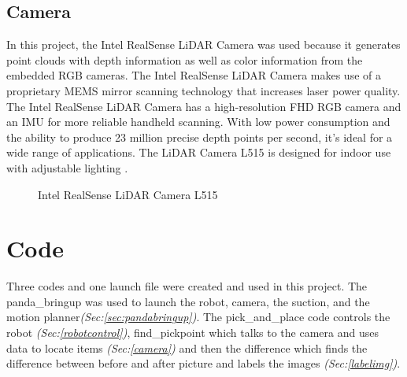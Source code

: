 \subsection{Camera\label{subsec:camera}} 
In this project, the Intel RealSense LiDAR Camera was used because it generates point clouds with depth information as well as color information from the embedded RGB cameras. The Intel RealSense LiDAR Camera makes use of a proprietary MEMS mirror scanning technology that increases laser power quality. The Intel RealSense LiDAR Camera has a high-resolution FHD RGB camera and an IMU for more reliable handheld scanning. With low power consumption and the ability to produce 23 million precise depth points per second, it's ideal for a wide range of applications. The LiDAR Camera L515 is designed for indoor use with adjustable lighting \cite{noauthor_intel_nodate}.
\begin{figure}[h]
    \centering
    \hfill
    \caption{Intel RealSense LiDAR Camera L515 \cite{noauthor_intel_nodate}}
    \label{figure: lidar}
\end{figure}
\clearpage

\section{Code}
Three codes and one launch file were created and used in this project. The panda\_bringup was used to launch the robot, camera, the suction, and the motion planner\textit{(Sec:\ref{sec:pandabringup})}. 
The pick\_and\_place code controls the robot \textit{(Sec:\ref{robotcontrol})}, find\_pickpoint which talks to the camera and uses data to locate items \textit{(Sec:\ref{camera})} and then the difference which finds the difference between before and after picture and labels the images \textit{(Sec:\ref{labelimg})}.

